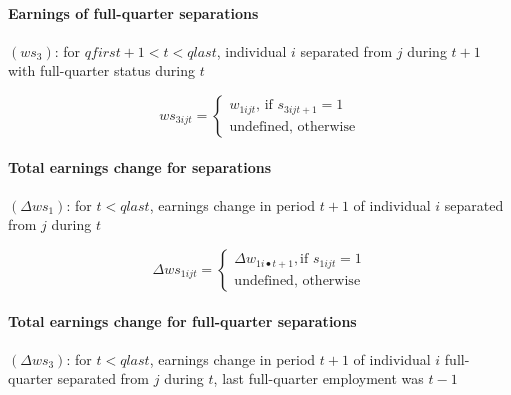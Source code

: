 \paragraph{Earnings of full-quarter separations}


$\left( ws_{3}\right) $: for $qfirst+1<t<qlast$, individual $i$ separated
from $j$ during $t+1$ with full-quarter status during $t$

\begin{equation}
ws_{3ijt}=\left\{ 
\begin{array}{l}
{w_{1ijt}}\text{, if }{s_{3ijt+1}=1} \\ 
\text{{undefined, otherwise}}%
\end{array}%
\right.
\end{equation}

\paragraph{Total earnings change for separations}


$\left( \Delta ws_{1}\right) $: for $t<qlast$, earnings change in period $%
t+1 $ of individual $i$ separated from $j$ during $t$

\begin{equation}
\Delta ws_{1ijt}=\left\{ 
\begin{array}{l}
{\Delta w_{1i\bullet t+1},}\text{if }{s_{1ijt}=1} \\ 
\text{{undefined, otherwise}}%
\end{array}%
\right.
\end{equation}

\paragraph{Total earnings change for full-quarter separations}


$\left( \Delta ws_{3}\right) $: for $t<qlast$, earnings change in period $%
t+1 $ of individual $i$ full-quarter separated from $j$ during $t$, last
full-quarter employment was $t-1$

